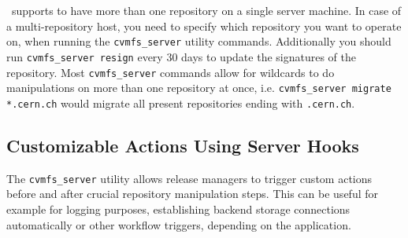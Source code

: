 \cvmfs\ supports to have more than one repository on a single server machine.
In case of a multi-repository host, you need to specify which repository you want to operate on, when running the \texttt{cvmfs\_server} utility commands.
Additionally you should run \texttt{cvmfs\_server resign} every 30 days to update the signatures of the repository.
Most \texttt{cvmfs\_server} commands allow for wildcards to do manipulations on more than one repository at once, i.e. \texttt{cvmfs\_server migrate *.cern.ch} would migrate all present repositories ending with \texttt{.cern.ch}.

\subsection{Customizable Actions Using Server Hooks}
The \texttt{cvmfs\_server} utility allows release managers to trigger custom actions before and after crucial repository manipulation steps. This can be useful for example for logging purposes, establishing backend storage connections automatically or other workflow triggers, depending on the application.

